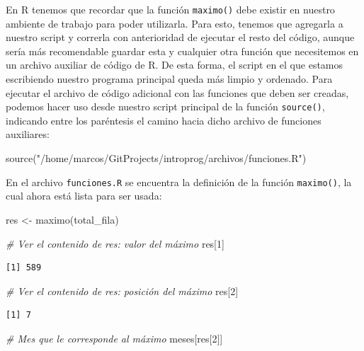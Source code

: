 \documentclass[
]{book}
\newenvironment{Shaded}{\begin{snugshade}}{\end{snugshade}}
\newcommand{\CommentTok}[1]{\textcolor[rgb]{0.56,0.35,0.01}{\textit{#1}}}
\newcommand{\DecValTok}[1]{\textcolor[rgb]{0.00,0.00,0.81}{#1}}
\newcommand{\FunctionTok}[1]{\textcolor[rgb]{0.00,0.00,0.00}{#1}}
\newcommand{\NormalTok}[1]{#1}
\newcommand{\OtherTok}[1]{\textcolor[rgb]{0.56,0.35,0.01}{#1}}
\newcommand{\StringTok}[1]{\textcolor[rgb]{0.31,0.60,0.02}{#1}}
\begin{document}
En R tenemos que recordar que la función \texttt{maximo()} debe existir en nuestro ambiente de trabajo para poder utilizarla. Para esto, tenemos que agregarla a nuestro script y correrla con anterioridad de ejecutar el resto del código, aunque sería más recomendable guardar esta y cualquier otra función que necesitemos en un archivo auxiliar de código de R. De esta forma, el script en el que estamos escribiendo nuestro programa principal queda más limpio y ordenado. Para ejecutar el archivo de código adicional con las funciones que deben ser creadas, podemos hacer uso desde nuestro script principal de la función \texttt{source()}, indicando entre los paréntesis el camino hacia dicho archivo de funciones auxiliares:

\begin{Shaded}
\begin{Highlighting}[]
\FunctionTok{source}\NormalTok{(}\StringTok{"/home/marcos/GitProjects/introprog/archivos/funciones.R"}\NormalTok{)}
\end{Highlighting}
\end{Shaded}

En el archivo \texttt{funciones.R} se encuentra la definición de la función \texttt{maximo()}, la cual ahora está lista para ser usada:

\begin{Shaded}
\begin{Highlighting}[]
\NormalTok{res }\OtherTok{\textless{}{-}} \FunctionTok{maximo}\NormalTok{(total\_fila)}

\CommentTok{\# Ver el contenido de res: valor del máximo}
\NormalTok{res[}\DecValTok{1}\NormalTok{]}
\end{Highlighting}
\end{Shaded}

\begin{verbatim}
[1] 589
\end{verbatim}

\begin{Shaded}
\begin{Highlighting}[]
\CommentTok{\# Ver el contenido de res: posición del máximo}
\NormalTok{res[}\DecValTok{2}\NormalTok{]}
\end{Highlighting}
\end{Shaded}

\begin{verbatim}
[1] 7
\end{verbatim}

\begin{Shaded}
\begin{Highlighting}[]
\CommentTok{\# Mes que le corresponde al máximo}
\NormalTok{meses[res[}\DecValTok{2}\NormalTok{]]}
\end{Highlighting}
\end{Shaded}
\end{document}
